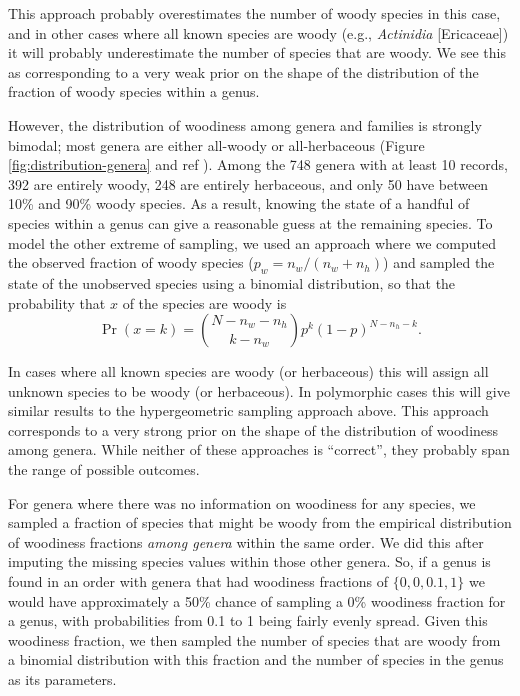 \documentclass[a4paper,12pt]{article}
\begin{document}
This approach probably overestimates the number of woody species in
this case, and in other cases where all known species are woody (e.g.,
\textit{Actinidia} [Ericaceae]) it will probably underestimate the
number of species that are woody. We see this as corresponding to a
very weak prior on the shape of the distribution of the fraction of
woody species within a genus.

However, the distribution of woodiness among genera and families is
strongly bimodal; most genera are either all-woody or all-herbaceous
(Figure \ref{fig:distribution-genera} and ref
\citep{sinnott1915evolution}).  Among the 748 genera with at least 10
records, 392 are entirely woody, 248 are entirely herbaceous, and only
50 have between 10\% and 90\% woody species. As a result, knowing the
state of a handful of species within a genus can give a reasonable
guess at the remaining species.
To model the other extreme of sampling, we used an approach where we
computed the observed fraction of woody species ($p_w = n_w / (n_w +
n_h)$) and sampled the state of the unobserved species using a
binomial distribution, so that the probability that $x$ of the species
are woody is
\begin{equation}
  \Pr(x = k) = {N - n_w - n_h \choose k - n_w} 
  p^k (1-p)^{N - n_h - k}.
\end{equation}

In cases where all known species are woody (or herbaceous) this will
assign all unknown species to be woody (or herbaceous). In polymorphic
cases this will give similar results to the hypergeometric sampling
approach above. This approach corresponds to a very strong prior on
the shape of the distribution of woodiness among genera.
While neither of these approaches is ``correct'', they probably
span the range of possible outcomes.

For genera where there was no information on woodiness for any
species, we sampled a fraction of species that might be woody from the
empirical distribution of woodiness fractions \textit{among genera}
within the same order. We did this after imputing the missing species
values within those other genera. So, if a genus is found in an order
with genera that had woodiness fractions of $\{0, 0, 0.1, 1\}$ we would
have approximately a 50\% chance of sampling a 0\% woodiness fraction
for a genus, with probabilities from 0.1 to 1 being fairly evenly
spread.  Given this woodiness fraction, we then sampled the number of
species that are woody from a binomial distribution with this fraction
and the number of species in the genus as its parameters.
\end{document}
